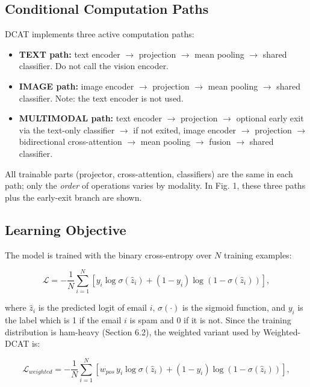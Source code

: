 \documentclass[10pt,twoside]{article}
\begin{document}
\subsection{Conditional Computation Paths}\label{sec:4.3}

DCAT implements three active computation paths:

\begin{itemize}[leftmargin=*,itemsep=1.5pt]
\item \textbf{TEXT path:} text encoder $\rightarrow$ projection $\rightarrow$ mean pooling $\rightarrow$ shared classifier. Do not call the vision encoder.
\item \textbf{IMAGE path:} image encoder $\rightarrow$ projection $\rightarrow$ mean pooling $\rightarrow$ shared classifier. Note: the text encoder is not used.
\item \textbf{MULTIMODAL path:} text encoder $\rightarrow$ projection $\rightarrow$ optional early exit via the text-only classifier $\rightarrow$ if not exited, image encoder $\rightarrow$ projection $\rightarrow$ bidirectional cross-attention $\rightarrow$ mean pooling $\rightarrow$ fusion $\rightarrow$ shared classifier.
\end{itemize}

All trainable parts (projector, cross-attention, classifiers) are the same in each path; only the \emph{order} of operations varies by modality. In Fig. 1, these three paths plus the early-exit branch are shown.

\subsection{Learning Objective}\label{sec:4.4}

The model is trained with the binary cross-entropy over $N$ training examples:

\begin{equation}\label{eq:4}
\mathcal{L} = -\frac{1}{N} \sum_{i=1}^{N} \left[ y_i \log \sigma(\hat{z}_i) + (1 - y_i) \log \left( 1 - \sigma(\hat{z}_i) \right) \right],
\end{equation}

where $\hat{z}_i$ is the predicted logit of email $i$, $\sigma(\cdot)$ is the sigmoid function, and $y_i$ is the label which is 1 if the email $i$ is spam and 0 if it is not. Since the training distribution is ham-heavy (Section 6.2), the weighted variant used by Weighted-DCAT is:

\begin{equation}\label{eq:5}
\mathcal{L}_{weighted} = -\frac{1}{N} \sum_{i=1}^{N} \left[ w_{pos}\, y_i \log \sigma(\hat{z}_i) + (1 - y_i) \log \left( 1 - \sigma(\hat{z}_i) \right) \right],
\end{equation}
\end{document}
